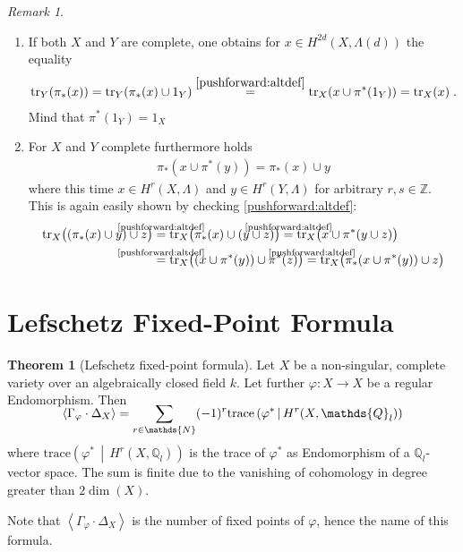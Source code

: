 \documentclass[english]{scrartcl}
\theoremstyle{definition}
\newtheorem{Thm}[Def]{Theorem}
\theoremstyle{remark}
\newtheorem{Rem}[Def]{Remark}
\newcommand*{\N}{\mathds{N}}
\newcommand*{\Z}{\mathds{Z}}
\newcommand*{\Q}{\mathds{Q}}
\newcommand*{\Zl}{\Z_l} %
\newcommand*{\Ql}{\Q_l} %
\newcommand*{\Tr}{\text{tr}} %
\newcommand*{\intProd}[2]{{#1\cdot#2}} %
\newcommand*{\intNum}[1]{{\left\langle{#1}\right\rangle}} %
\newcommand*{\Graph}[1]{{\Gamma_{#1}}} %
\newcommand*{\Diag}[1]{{\Delta_{#1}}} %
\newcommand*{\trace}[2]{{\text{trace}\left(#1 \,\middle|\, #2 \right)}} %
\newcommand*{\one}[1]{{1_{#1}}}%
\renewcommand*{\phi}{\varphi}
\begin{document}
\begin{Rem}
\begin{enumerate}[label=(P\arabic*)]
  \item\label{pushforward:trace}
    If both $X$ and $Y$ are complete, one obtains for
    $x\in H^{2d}(X,\Lambda(d))$ the equality
    \begin{gather*}
      \Tr_Y(\pi_*(x))
      = \Tr_Y(\pi_*(x)\cup \one{Y})
      \overset{\ref{pushforward:altdef}}= \Tr_X(x\cup\pi^*(\one{Y}))
      = \Tr_X(x)
      \;.
    \end{gather*}
    Mind that $\pi^*(\one{Y})=\one{X}$
    \cite[compare][Rem.~V.11.6.]{milnebook} %
  \item
    For $X$ and $Y$ complete furthermore holds
    \begin{gather}
      \tag{Projection Formula}\label{pushforward:projectionformula}
      \pi_*(x\cup \pi^*(y)) = \pi_*(x)\cup y
    \end{gather}
    where this time $x\in H^r(X,\Lambda)$ and $y\in H^r(Y,\Lambda)$
    for arbitrary $r,s\in\Z$. This is again easily shown by checking
    \ref{pushforward:altdef}:
    \begin{align*}
      \Tr_X\big((\pi_*(x)\cup y) \cup z\big)
      &\overset{\mathclap{\text{\ref{pushforward:altdef}}}}=
      \Tr_X\big(\pi_*(x)\cup (y \cup z)\big)
      \overset{\mathclap{\text{\ref{pushforward:altdef}}}}=
      \Tr_X\big( x\cup \pi^*(y\cup z)\big)\\
      &\overset{\mathclap{\text{\ref{pushforward:altdef}}}}=
      \Tr_X\big( (x\cup \pi^*(y)) \cup \pi^*(z) \big)
      \overset{\mathclap{\text{\ref{pushforward:altdef}}}}=
      \Tr_X\big( \pi_*(x\cup \pi^*(y)) \cup z\big)
    \end{align*}
  \end{enumerate}
\end{Rem}

\section{Lefschetz Fixed-Point Formula}

\begin{Thm}[Lefschetz fixed-point formula]\label{lefschetzthm}
  Let $X$ be a non-singular, complete variety over an algebraically
  closed field $k$.
  Let further $\phi\colon X\to X$ be a regular Endomorphism.
  Then
  \begin{gather*}
    \SwapAboveDisplaySkip
    \intNum{\intProd{\Graph{\phi}}{\Diag{X}}}
    = \sum_{r\in\N} (-1)^r \trace{\phi^*}{H^r(X,\Ql)}
  \end{gather*}
  where $\trace{\phi^*}{H^r(X,\Ql)}$ is the trace of $\phi^*$ as
  Endomorphism of a $\Ql$-vector space. 
  The sum is finite due to the vanishing
  of cohomology in degree greater than $2\dim(X)$. 
\end{Thm}
Note that $\intNum{\intProd{\Graph{\phi}}{\Diag{X}}}$ is the number of
fixed points of $\phi$, hence the name of this formula.
\end{document}
